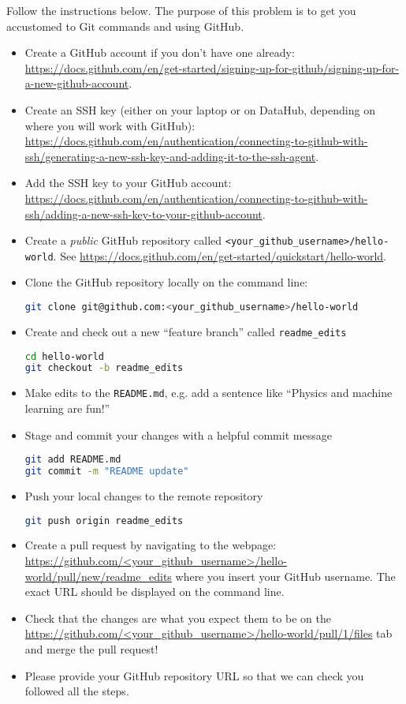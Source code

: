 \begin{problem}[20]
Follow the instructions below.
The purpose of this problem is to get you accustomed to Git commands and using GitHub.

\begin{itemize}
	\item Create a GitHub account if you don't have one already: \url{https://docs.github.com/en/get-started/signing-up-for-github/signing-up-for-a-new-github-account}.
	\item Create an SSH key (either on your laptop or on DataHub, depending on where you will work with GitHub): \url{https://docs.github.com/en/authentication/connecting-to-github-with-ssh/generating-a-new-ssh-key-and-adding-it-to-the-ssh-agent}.
	\item Add the SSH key to your GitHub account: \url{https://docs.github.com/en/authentication/connecting-to-github-with-ssh/adding-a-new-ssh-key-to-your-github-account}.
	\item Create a \emph{public} GitHub repository called \texttt{<your_github_username>/hello-world}. See \url{https://docs.github.com/en/get-started/quickstart/hello-world}.
	\item Clone the GitHub repository locally on the command line:
	      \begin{lstlisting}[language=bash]
git clone git@github.com:<your_github_username>/hello-world
		\end{lstlisting}
	\item Create and check out a new ``feature branch'' called \texttt{readme_edits}
	      \begin{lstlisting}[language=bash]
cd hello-world
git checkout -b readme_edits
  \end{lstlisting}
	\item Make edits to the \texttt{README.md}, e.g. add a sentence like ``Physics and machine learning are fun!''
	\item Stage and commit your changes with a helpful commit message
	      \begin{lstlisting}[language=bash]
git add README.md
git commit -m "README update"
\end{lstlisting}
	\item Push your local changes to the remote repository
	      \begin{lstlisting}[language=bash]
git push origin readme_edits
\end{lstlisting}
	\item Create a pull request by navigating to the webpage: \url{https://github.com/<your_github_username>/hello-world/pull/new/readme_edits} where you insert your GitHub username.
	      The exact URL should be displayed on the command line.
	\item Check that the changes are what you expect them to be on the \url{https://github.com/<your_github_username>/hello-world/pull/1/files} tab and merge the pull request!
	\item Please provide your GitHub repository URL so that we can check you followed all the steps.
\end{itemize}
\end{problem}

